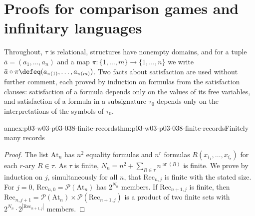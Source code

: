\section{Proofs for comparison games and infinitary languages}
\label{sec:p03-w03-p03-038-annex}

Throughout, \(\tau\) is relational, structures have nonempty domains, and
for a tuple \(\bar a=(a_1,\ldots,a_n)\) and a map
\(\pi:\{1,\ldots,m\}\to\{1,\ldots,n\}\) we write
\(\bar a\circ\pi\defeq(a_{\pi(1)},\ldots,a_{\pi(m)})\). Two facts about
satisfaction are used without further comment, each proved by induction on
formulas from the satisfaction clauses: satisfaction of a formula depends
only on the values of its free variables, and satisfaction of a formula in
a subsignature \(\tau_0\) depends only on the interpretations of the symbols
of \(\tau_0\).

\begin{annexitem}{annex:p03-w03-p03-038-finite-records}{thm:p03-w03-p03-038-finite-records}{Finitely many records}
\begin{proof}
The list \(\mathrm{At}_n\) has \(n^2\) equality formulas and
\(n^{r}\) formulas \(R(x_{i_1},\ldots,x_{i_r})\) for each \(r\)-ary
\(R\in\tau\). As \(\tau\) is finite,
\(N_n=n^2+\sum_{R\in\tau}n^{\operatorname{ar}(R)}\) is finite. We prove by
induction on \(j\), simultaneously for all \(n\), that
\(\mathrm{Rec}_{n,j}\) is finite with the stated size. For \(j=0\),
\(\mathrm{Rec}_{n,0}=\mathcal P(\mathrm{At}_n)\) has \(2^{N_n}\) members.
If \(\mathrm{Rec}_{n+1,j}\) is finite, then
\(\mathrm{Rec}_{n,j+1}=\mathcal P(\mathrm{At}_n)\times
\mathcal P(\mathrm{Rec}_{n+1,j})\) is a product of two finite sets with
\(2^{N_n}\cdot2^{|\mathrm{Rec}_{n+1,j}|}\) members.
\end{proof}
\end{annexitem}


